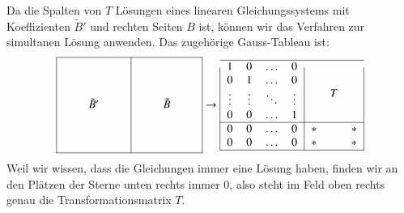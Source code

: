 Da die Spalten von $T$ Lösungen eines linearen Gleichungssystems
mit Koeffizienten $\tilde B'$ und rechten Seiten $B$ ist, können
wir das Verfahren zur simultanen Lösung anwenden.
Das zugehörige Gauss-Tableau ist:
\[
\begin{tabular}{|>{$}c<{$}>{$}c<{$}>{$}c<{$}|>{$}c<{$}>{$}c<{$}>{$}c<{$}|}
\hline
\quad\mathstrut&         &\quad\mathstrut&\quad\mathstrut&        &\quad\mathstrut\\
      &         &      &      &        &      \mathstrut\\
      &         &      &      &        &      \mathstrut\\
      &\tilde B'&      &      &\tilde B&      \mathstrut\\
      &         &      &      &        &      \mathstrut\\
      &         &      &      &        &      \mathstrut\\
      &         &      &      &        &      \mathstrut\\
\hline
\end{tabular}
\rightarrow
\begin{tabular}{|>{$}c<{$}>{$}c<{$}>{$}c<{$}>{$}c<{$}|>{$}c<{$}>{$}c<{$}>{$}c<{$}|}
\hline
1     &     0&\dots   &0      & &                   & \\
0     &     1&\dots   &0      & &                   & \\
\vdots&\vdots&\ddots  &\vdots & &\raisebox{7pt}{$T$}& \\
0     &     0&\dots   &1      & &                   & \\
\hline
0     &     0&\dots   &0      &*&                   &*\\
0     &     0&\dots   &0      &*&                   &*\\
\hline
\end{tabular}
\]
Weil wir wissen, dass die Gleichungen immer eine Lösung haben, finden
wir an den Plätzen der Sterne unten rechts immer $0$, also steht im
Feld oben rechts genau die Transformationsmatrix $T$.

